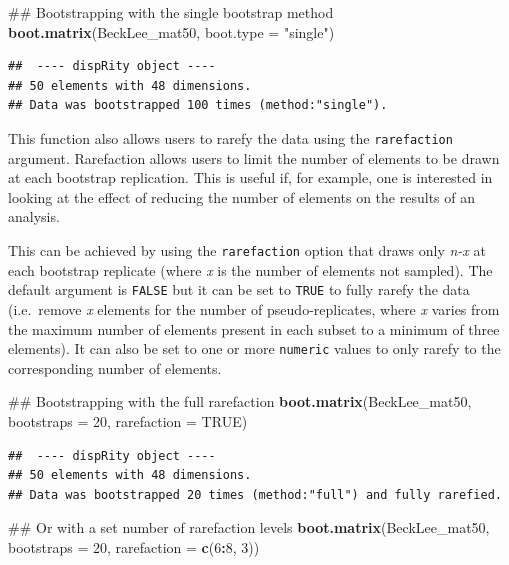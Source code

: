 \documentclass[]{book}
\newenvironment{Shaded}{\begin{snugshade}}{\end{snugshade}}
\newcommand{\KeywordTok}[1]{\textcolor[rgb]{0.13,0.29,0.53}{\textbf{#1}}}
\newcommand{\DataTypeTok}[1]{\textcolor[rgb]{0.13,0.29,0.53}{#1}}
\newcommand{\DecValTok}[1]{\textcolor[rgb]{0.00,0.00,0.81}{#1}}
\newcommand{\StringTok}[1]{\textcolor[rgb]{0.31,0.60,0.02}{#1}}
\newcommand{\OtherTok}[1]{\textcolor[rgb]{0.56,0.35,0.01}{#1}}
\newcommand{\OperatorTok}[1]{\textcolor[rgb]{0.81,0.36,0.00}{\textbf{#1}}}
\newcommand{\NormalTok}[1]{#1}
\theoremstyle{definition}
\theoremstyle{definition}
\theoremstyle{remark}
\begin{document}
\begin{Shaded}
\begin{Highlighting}[]
\NormalTok{## Bootstrapping with the single bootstrap method}
\KeywordTok{boot.matrix}\NormalTok{(BeckLee_mat50, }\DataTypeTok{boot.type =} \StringTok{"single"}\NormalTok{)}
\end{Highlighting}
\end{Shaded}

\begin{verbatim}
##  ---- dispRity object ---- 
## 50 elements with 48 dimensions.
## Data was bootstrapped 100 times (method:"single").
\end{verbatim}

This function also allows users to rarefy the data using the
\texttt{rarefaction} argument. Rarefaction allows users to limit the
number of elements to be drawn at each bootstrap replication. This is
useful if, for example, one is interested in looking at the effect of
reducing the number of elements on the results of an analysis.

This can be achieved by using the \texttt{rarefaction} option that draws
only \emph{n-x} at each bootstrap replicate (where \emph{x} is the
number of elements not sampled). The default argument is \texttt{FALSE}
but it can be set to \texttt{TRUE} to fully rarefy the data (i.e.~remove
\emph{x} elements for the number of pseudo-replicates, where \emph{x}
varies from the maximum number of elements present in each subset to a
minimum of three elements). It can also be set to one or more
\texttt{numeric} values to only rarefy to the corresponding number of
elements.

\begin{Shaded}
\begin{Highlighting}[]
\NormalTok{## Bootstrapping with the full rarefaction}
\KeywordTok{boot.matrix}\NormalTok{(BeckLee_mat50, }\DataTypeTok{bootstraps =} \DecValTok{20}\NormalTok{, }\DataTypeTok{rarefaction =} \OtherTok{TRUE}\NormalTok{)}
\end{Highlighting}
\end{Shaded}

\begin{verbatim}
##  ---- dispRity object ---- 
## 50 elements with 48 dimensions.
## Data was bootstrapped 20 times (method:"full") and fully rarefied.
\end{verbatim}

\begin{Shaded}
\begin{Highlighting}[]
\NormalTok{## Or with a set number of rarefaction levels}
\KeywordTok{boot.matrix}\NormalTok{(BeckLee_mat50, }\DataTypeTok{bootstraps =} \DecValTok{20}\NormalTok{, }\DataTypeTok{rarefaction =} \KeywordTok{c}\NormalTok{(}\DecValTok{6}\OperatorTok{:}\DecValTok{8}\NormalTok{, }\DecValTok{3}\NormalTok{))}
\end{Highlighting}
\end{Shaded}
\end{document}
